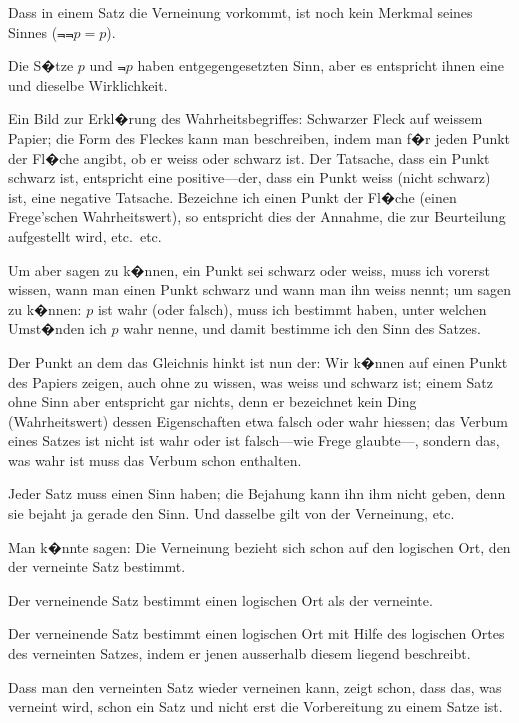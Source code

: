 \begin{propositions}
{Dass in einem Satz die Verneinung vorkommt,
ist noch kein Merkmal seines Sinnes ($\Not{\Not{p}} = p$).

Die S�tze \glqq{}$p$\grqq{} und \glqq{}$\Not{p}$\grqq{} haben entgegengesetzten
Sinn, aber es entspricht ihnen eine und
dieselbe Wirklichkeit.}


{Ein Bild zur Erkl�rung des Wahrheitsbegriffes:
Schwarzer Fleck auf weissem Papier; die Form
des Fleckes kann man beschreiben, indem man
f�r jeden Punkt der Fl�che angibt, ob er weiss
oder schwarz ist. Der Tatsache, dass ein Punkt
schwarz ist, entspricht eine positive---der, dass
ein Punkt weiss (nicht schwarz) ist, eine negative
Tatsache. Bezeichne ich einen Punkt der Fl�che
(einen Frege'schen Wahrheitswert), so entspricht
dies der Annahme, die zur Beurteilung aufgestellt
wird, etc.\ etc.

Um aber sagen zu k�nnen, ein Punkt sei
schwarz oder weiss, muss ich vorerst wissen,
wann man einen Punkt schwarz und wann
man ihn weiss nennt; um sagen zu k�nnen:
\glqq{}$p$\grqq{} ist wahr (oder falsch), muss ich bestimmt
haben, unter welchen Umst�nden ich \glqq{}$p$\grqq{} wahr
nenne, und damit bestimme ich den Sinn des
Satzes.

Der Punkt an dem das Gleichnis hinkt ist
nun der: Wir k�nnen auf einen Punkt des Papiers
zeigen, auch ohne zu wissen, was weiss und
schwarz ist; einem Satz ohne Sinn aber entspricht
gar nichts, denn er bezeichnet kein Ding (Wahrheitswert)
dessen Eigenschaften etwa \glqq{}falsch\grqq{} oder
\glqq{}wahr\grqq{} hiessen; das Verbum eines Satzes ist nicht
\glqq{}ist wahr\grqq{} oder \glqq{}ist falsch\grqq{}---wie Frege glaubte---,
sondern das, was \glqq{}wahr ist\grqq{} muss das Verbum
schon enthalten.}


{Jeder Satz muss  einen Sinn haben;
die Bejahung kann ihn ihm nicht geben, denn
sie bejaht ja gerade den Sinn. Und dasselbe gilt
von der Verneinung, etc.}


{Man k�nnte sagen: Die Verneinung bezieht
sich schon auf den logischen Ort, den der verneinte
Satz bestimmt.

Der verneinende Satz bestimmt einen 
logischen Ort als der verneinte.

Der verneinende Satz bestimmt einen logischen
Ort mit Hilfe des logischen Ortes des verneinten
Satzes, indem er jenen ausserhalb diesem liegend
beschreibt.

Dass man den verneinten Satz wieder verneinen
kann, zeigt schon, dass das, was verneint wird,
schon ein Satz und nicht erst die Vorbereitung
zu einem Satze ist.}



\end{propositions}
